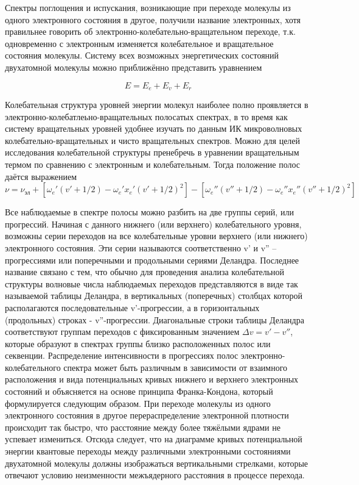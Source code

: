 Спектры поглощения и испускания, возникающие при переходе молекулы из
одного электронного состояния в другое, получили название электронных, хотя
правильнее говорить об электронно-колебательно-вращательном переходе, т.к.
одновременно с электронным изменяется колебательное и вращательное
состояния молекулы. Систему всех
возможных энергетических состояний двухатомной молекулы можно
приближённо представить уравнением

\begin{equation}
E = E_e+E_v+E_r
\end{equation}

Колебательная структура уровней энергии молекул наиболее полно
проявляется в электронно-колебатлеьно-вращательных полосатых спектрах, в
то время как систему вращательных уровней удобнее изучать по данным ИК
микроволновых колебательно-вращательных и чисто вращательных спектров.
Можно для целей исследования колебательной
структуры пренебречь в уравнении  вращательным термом по сравнению с
электронным и колебательным. Тогда положение полос даётся выражением
\begin{equation}
\nu = \nu_{\text{эл}} + \left[\omega_e'(v'+1/2)-\omega_e' x_e'(v'+1/2)^2\right]-\left[\omega_e''(v''+1/2)-\omega_e'' x_e''(v''+1/2)^2\right]
\end{equation}


Все наблюдаемые в спектре полосы можно разбить на две
группы серий, или прогрессий. Начиная с данного нижнего (или верхнего)
колебательного уровня, возможны серии переходов на все колебательные
уровни верхнего (или нижнего) электронного состояния. Эти серии называются
соответственно v' и v'' --прогрессиями или поперечными и продольными
сериями Деландра. Последнее название связано с тем, что обычно для
проведения анализа колебательной структуры волновые числа наблюдаемых
переходов представляются в виде так называемой таблицы Деландра, в
вертикальных (поперечных) столбцах которой располагаются
последовательные v'-прогрессии, а в горизонтальных (продольных) строках -
v''-прогрессии. Диагональные строки таблицы Деландра соответствуют
группам переходов с фиксированным значением $\Delta v = v' - v''$, которые образуют в
спектрах группы близко расположенных полос или секвенции.
Распределение интенсивности в прогрессиях полос электронно-колебательного
спектра может быть различным в зависимости от взаимного расположения и
вида потенциальных кривых нижнего и верхнего электронных состояний и
объясняется на основе принципа Франка-Кондона, который формулируется
следующим образом. При переходе молекулы из одного электронного
состояния в другое перераспределение электронной плотности происходит так
быстро, что расстояние между более тяжёлыми ядрами не успевает измениться.
Отсюда следует, что на диаграмме кривых потенциальной энергии
квантовые переходы между различными электронными состояниями
двухатомной молекулы должны изображаться вертикальными стрелками,
которые отвечают условию неизменности межъядерного расстояния в процессе
перехода.



